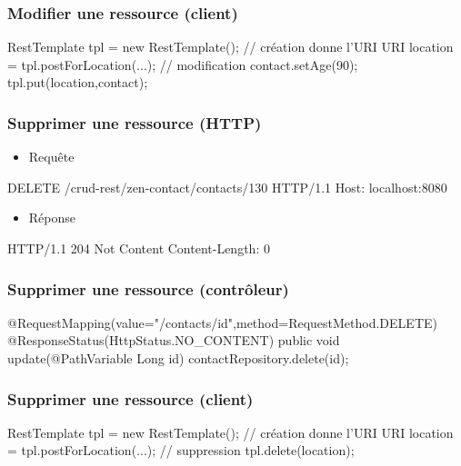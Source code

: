 \begin{frame}[fragile]
 \frametitle{Modifier une ressource (client)}
 
 \begin{javacode}
RestTemplate tpl = new RestTemplate();
// cr\'eation donne l'URI
URI location = tpl.postForLocation(...);
// modification
contact.setAge(90);
tpl.put(location,contact);
 \end{javacode}  

\end{frame}

\begin{frame}[fragile]
 \frametitle{Supprimer une ressource (HTTP)}
 
 \begin{itemize}
  \item Requête
 \end{itemize} 
 
 \begin{textcode}
DELETE /crud-rest/zen-contact/contacts/130 HTTP/1.1
Host: localhost:8080
 \end{textcode}
 
  \begin{itemize}
  \item Réponse
 \end{itemize} 
 
 \begin{textcode}
HTTP/1.1 204 Not Content
Content-Length: 0
 \end{textcode}

\end{frame}

\begin{frame}[fragile]
 \frametitle{Supprimer une ressource (contrôleur)}
 
 \begin{javacode}
@RequestMapping(value="/contacts/{id}",method=RequestMethod.DELETE)
@ResponseStatus(HttpStatus.NO_CONTENT)
public void update(@PathVariable Long id) {
  contactRepository.delete(id);
}
 \end{javacode}  

\end{frame}

\begin{frame}[fragile]
 \frametitle{Supprimer une ressource (client)}
 
 \begin{javacode}
RestTemplate tpl = new RestTemplate();
// cr\'eation donne l'URI
URI location = tpl.postForLocation(...);
// suppression
tpl.delete(location);
 \end{javacode}  

\end{frame}

